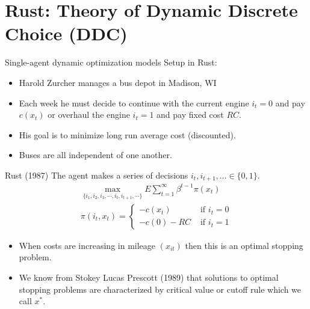 \documentclass[xcolor=pdftex,dvipsnames,table,mathserif,aspectratio=169]{beamer}
\begin{document}
\section{Rust: Theory of Dynamic Discrete Choice (DDC)}

\begin{frame}{Single-agent dynamic optimization models}
Setup in Rust:
\begin{itemize}
\item Harold Zurcher manages a bus depot in Madison, WI
\item Each week he must decide to continue with the current engine $i_t=0$ and pay $c(x_{t})$ or overhaul the engine $i_t=1$ and pay fixed cost $RC$.
\item His goal is to minimize \alert{long run average cost} (discounted).
\item Buses are all  \alert{independent} of one another.
\end{itemize}
\end{frame}




\begin{frame}{Rust (1987)}
The agent makes a series of decisions $i_t,i_{t+1},\ldots \in \{0,1\}$.
\begin{eqnarray*}
\max_{\{i_1, i_2, i_3, \cdots, i_t, i_{t+1}, \cdots \}} E \sum^{\infty}_{t=1} \beta^{t-1} \pi (x_t)\\
\pi \left(i_{t},x_{t} \right)=
		\begin{cases}
		-c\left(x_{t} \right)  & \mbox{ if }i_{t}=0\\		
		 -c\left(0\right) -RC& \mbox{ if }i_{t}=1
		\end{cases}
\end{eqnarray*}
\begin{itemize}
\item When costs are increasing in mileage $(x_{it})$ then this is an \alert{optimal stopping problem}.
\item We know from Stokey Lucas Prescott (1989) that solutions to optimal stopping problems are characterized by \alert{critical value} or \alert{cutoff rule} which we call $x^*$.
\end{itemize}
\end{frame}
\end{document}

